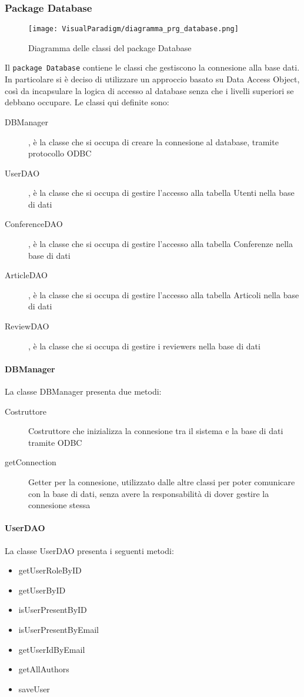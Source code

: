 \subsubsection{Package Database}
\begin{figure}[ht]
  \centering
  \texttt{[image: VisualParadigm/diagramma\_prg\_database.png]}
  \caption{Diagramma delle classi del package Database}
  \label{fig:package_database}
\end{figure}

Il \texttt{package Database} contiene le classi che gestiscono la connesione
alla base dati. In particolare si è deciso di utilizzare un approccio basato
su Data Access Object, così da incapsulare la logica di accesso al database
senza che i livelli superiori se debbano occupare.
Le classi qui definite sono:
\begin{description}
\item[DBManager], è la classe che si occupa di creare la connesione al database, tramite protocollo ODBC
\item[UserDAO], è la classe che si occupa di gestire l'accesso alla tabella Utenti nella base di dati
\item[ConferenceDAO], è la classe che si occupa di gestire l'accesso alla tabella Conferenze nella base di dati
\item[ArticleDAO], è la classe che si occupa di gestire l'accesso alla tabella Articoli nella base di dati
\item[ReviewDAO], è la classe che si occupa di gestire i reviewers nella base di dati
\end{description}

\paragraph{DBManager}
La classe DBManager presenta due metodi:
\begin{description}
\item[Costruttore] Costruttore che inizializza la connesione tra il sistema e la base di dati tramite ODBC
\item[getConnection] Getter per la connesione, utilizzato dalle altre classi
  per poter comunicare con la base di dati, senza avere la responsabilità di
  dover gestire la connesione stessa
\end{description}

\paragraph{UserDAO}
La classe UserDAO presenta i seguenti metodi:
\begin{itemize}
\item getUserRoleByID
\item getUserByID
\item isUserPresentByID
\item isUserPresentByEmail
\item getUserIdByEmail
\item getAllAuthors
\item saveUser
\end{itemize}

